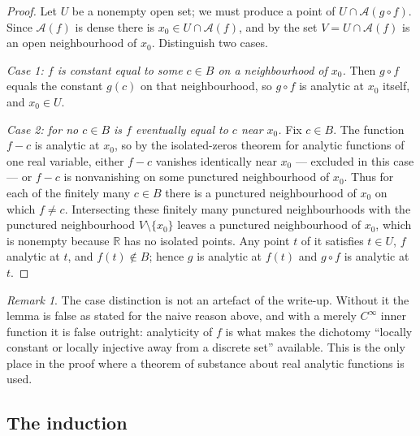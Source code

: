 \documentclass[11pt,oneside]{article}
\theoremstyle{definition}
\theoremstyle{remark}
\newtheorem{remark}[theorem]{Remark}
\newcommand{\R}{\mathbb R}
\newcommand{\An}{\mathcal A}
\begin{document}
\begin{proof}
Let $U$ be a nonempty open set; we must produce a point of $U\cap\An(g\circ
f)$.  Since $\An(f)$ is dense there is $x_0\in U\cap\An(f)$, and by
 the set $V=U\cap\An(f)$ is an open neighbourhood of $x_0$.
Distinguish two cases.

\emph{Case 1: $f$ is constant equal to some $c\in B$ on a neighbourhood of
$x_0$.}  Then $g\circ f$ equals the constant $g(c)$ on that neighbourhood, so
$g\circ f$ is analytic at $x_0$ itself, and $x_0\in U$.

\emph{Case 2: for no $c\in B$ is $f$ eventually equal to $c$ near $x_0$.}  Fix
$c\in B$.  The function $f-c$ is analytic at $x_0$, so by the isolated-zeros
theorem for analytic functions of one real variable, either $f-c$ vanishes
identically near $x_0$ --- excluded in this case --- or $f-c$ is nonvanishing
on some punctured neighbourhood of $x_0$.  Thus for each of the finitely many
$c\in B$ there is a punctured neighbourhood of $x_0$ on which $f\ne c$.
Intersecting these finitely many punctured neighbourhoods with the punctured
neighbourhood $V\setminus\{x_0\}$ leaves a punctured neighbourhood of $x_0$,
which is nonempty because $\R$ has no isolated points.  Any point $t$ of it
satisfies $t\in U$, $f$ analytic at $t$, and $f(t)\notin B$; hence $g$ is
analytic at $f(t)$ and $g\circ f$ is analytic at $t$.
\end{proof}

\begin{remark}
The case distinction is not an artefact of the write-up.  Without it the lemma
is false as stated for the naive reason above, and with a merely $C^\infty$
inner function it is false outright: analyticity of $f$ is what makes the
dichotomy ``locally constant or locally injective away from a discrete set''
available.  This is the only place in the proof where a theorem of substance
about real analytic functions is used.
\end{remark}

\subsection{The induction}
\end{document}
